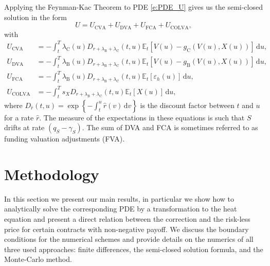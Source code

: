 \documentclass[a4paper,10pt]{article}
\renewcommand{\d}{\,\mathrm{d}}
\newcommand{\E}{\mathbb{E}}
\newcommand{\1}{\mathbf{1}}
\begin{document}
Applying the Feynman-Kac Theorem to PDE \eqref{e:PDE_U} gives us \citep{BurgardKjaer13} the semi-closed solution in the form
\begin{equation}
U = U_\text{CVA} + U_\text{DVA} + U_\text{FCA} + U_\text{COLVA}, \label{e:sol_MC}
\end{equation}
with
\begin{align}
U_\text{CVA} &= -\int_t^T \lambda_\text{C}(u)D_{r+\lambda_\text{B}+\lambda_\text{C}}(t,u)\E_t[V(u)-g_\text{C}(V(u),X(u))]\d u, \\
U_\text{DVA} &= -\int_t^T \lambda_\text{B}(u)D_{r+\lambda_\text{B}+\lambda_\text{C}}(t,u)\E_t[V(u)-g_\text{B}(V(u),X(u))] \d u,\\
U_\text{FCA} &= -\int_t^T \lambda_\text{B}(u)D_{r+\lambda_\text{B}+\lambda_\text{C}}(t,u)\E_t[\varepsilon_h(u)]\d u, \\
U_\text{COLVA} &= -\int_t^T s_X D_{r+\lambda_\text{B}+\lambda_\text{C}}(t,u)\E_t[X(u)]\d u,
\end{align}
where $D_{\hat{r}}(t,u) = \exp\left\{ -\int_t^u \hat{r}(v)\d v\right\}$ is the discount factor between $t$ and $u$ for a rate $\hat{r}$. The measure of the expectations in these equations is such that $S$ drifts at rate $(q_S-\gamma_S)$. The sum of DVA and FCA is sometimes referred to as funding valuation adjustments (FVA).

\section{Methodology}\label{sec:methodology}

In this section we present our main results, in particular we show how to analytically solve the corresponding PDE by a transformation to the heat equation and present a direct relation between the correction and the risk-less price for certain contracts with non-negative payoff. We discuss the boundary conditions for the numerical schemes and provide details on the numerics of all three used approaches: finite differences, the semi-closed solution formula, and the Monte-Carlo method.
\end{document}
